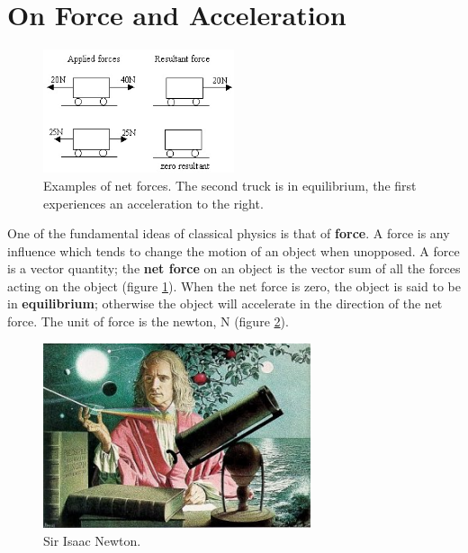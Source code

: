 \documentclass[a4paper]{amsbook}
\newcommand\capcite[1]{}
\begin{document}
\section{On Force and Acceleration}
\begin{figure}
  \centering
  \includegraphics[width=0.5\textwidth]{resultantforce}
  \caption{Examples of net forces. The second truck is in equilibrium, the first experiences an acceleration to the right. \capcite{https://cdn.miniphysics.com/wp-content/uploads/2014/11/forces-in-opposite-direction.jpg}\label{fig:resultant}}
\end{figure}
One of the fundamental ideas of classical physics is that of \textbf{force}. A force is any influence which tends to change the motion of an object
when unopposed. A force is a vector quantity; the \textbf{net force} on an object is the vector sum of all the forces acting on the
object (figure \ref{fig:resultant}).
When the net force is zero, the object is said to be in \textbf{equilibrium}; otherwise the object will accelerate in the direction of
the net force. The unit of force is the newton, N (figure \ref{fig:newton}).
\begin{figure}
  \centering
  \includegraphics[width=0.7\textwidth]{newton}
  \caption{Sir Isaac Newton. \capcite{http://teachertech.rice.edu/Participants/louviere/Newton/newton5.jpg}\label{fig:newton}}
\end{figure}
\end{document}
